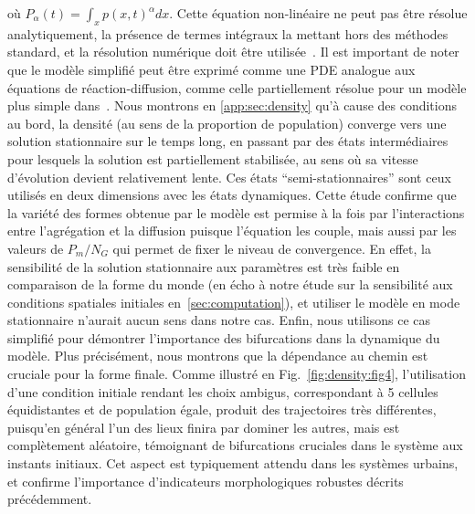 {où $P_{\alpha}(t) = \int_x p(x,t)^{\alpha} dx$. Cette équation non-linéaire ne peut pas être résolue analytiquement, la présence de termes intégraux la mettant hors des méthodes standard, et la résolution numérique doit être utilisée~\cite{tadmor2012review}. Il est important de noter que le modèle simplifié peut être exprimé comme une PDE analogue aux équations de réaction-diffusion, comme celle partiellement résolue pour un modèle plus simple dans~\cite{bosch1990velocity}. Nous montrons en \ref{app:sec:density} qu'à cause des conditions au bord, la densité (au sens de la proportion de population) converge vers une solution stationnaire sur le temps long, en passant par des états intermédiaires pour lesquels la solution est partiellement stabilisée, au sens où sa vitesse d'évolution devient relativement lente. Ces états ``semi-stationnaires'' sont ceux utilisés en deux dimensions avec les états dynamiques. Cette étude confirme que la variété des formes obtenue par le modèle est permise à la fois par l'interactions entre l'agrégation et la diffusion puisque l'équation les couple, mais aussi par les valeurs de $P_m / N_G$ qui permet de fixer le niveau de convergence. En effet, la sensibilité de la solution stationnaire aux paramètres est très faible en comparaison de la forme du monde (en écho à notre étude sur la sensibilité aux conditions spatiales initiales en~\ref{sec:computation}), et utiliser le modèle en mode stationnaire n'aurait aucun sens dans notre cas. Enfin, nous utilisons ce cas simplifié pour démontrer l'importance des bifurcations dans la dynamique du modèle. Plus précisément, nous montrons que la dépendance au chemin est cruciale pour la forme finale. Comme illustré en Fig.~\ref{fig:density:fig4}, l'utilisation d'une condition initiale rendant les choix ambigus, correspondant à 5 cellules équidistantes et de population égale, produit des trajectoires très différentes, puisqu'en général l'un des lieux finira par dominer les autres, mais est complètement aléatoire, témoignant de bifurcations cruciales dans le système aux instants initiaux. Cet aspect est typiquement attendu dans les systèmes urbains, et confirme l'importance d'indicateurs morphologiques robustes décrits précédemment.
}



